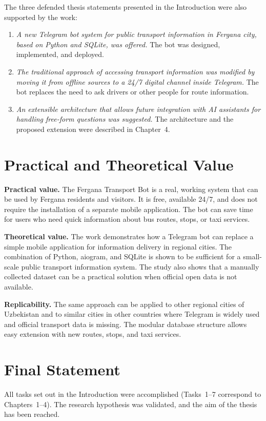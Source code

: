The three defended thesis statements presented in the Introduction were
also supported by the work:

\begin{enumerate}
    \item \textit{A new Telegram bot system for public transport
        information in Fergana city, based on Python and SQLite, was
        offered.} The bot was designed, implemented, and deployed.
    \item \textit{The traditional approach of accessing transport
        information was modified by moving it from offline sources to a
        24/7 digital channel inside Telegram.} The bot replaces the need
        to ask drivers or other people for route information.
    \item \textit{An extensible architecture that allows future
        integration with AI assistants for handling free-form questions
        was suggested.} The architecture and the proposed extension were
        described in Chapter~4.
\end{enumerate}

\section*{Practical and Theoretical Value}

\noindent\textbf{Practical value.} The Fergana Transport Bot is a real,
working system that can be used by Fergana residents and visitors. It is
free, available 24/7, and does not require the installation of a separate
mobile application. The bot can save time for users who need quick
information about bus routes, stops, or taxi services.

\noindent\textbf{Theoretical value.} The work demonstrates how a Telegram
bot can replace a simple mobile application for information delivery in
regional cities. The combination of Python, aiogram, and SQLite is shown to
be sufficient for a small-scale public transport information system. The
study also shows that a manually collected dataset can be a practical
solution when official open data is not available.

\noindent\textbf{Replicability.} The same approach can be applied to other
regional cities of Uzbekistan and to similar cities in other countries
where Telegram is widely used and official transport data is missing. The
modular database structure allows easy extension with new routes, stops,
and taxi services.

\section*{Final Statement}

All tasks set out in the Introduction were accomplished (Tasks~1--7
correspond to Chapters~1--4). The research hypothesis was validated, and
the aim of the thesis has been reached.